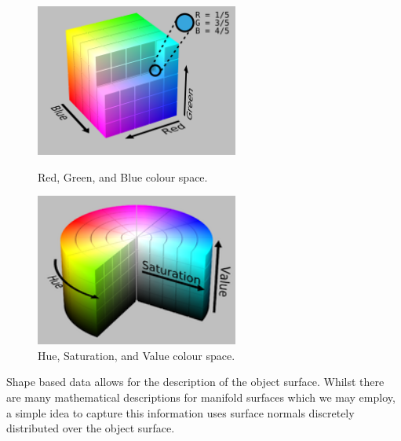 \documentclass[a4paper]{article}
\begin{document}
\vspace{0.5cm}
 
\begin{figure}[h]
	\centering
	\begin{minipage}{0.45\textwidth}
		\centering
		\includegraphics[height=5cm]{RGB_colour_space}
		\caption{Red, Green, and Blue colour space.}
	\end{minipage}
	\hspace{1cm}
	\begin{minipage}{0.45\textwidth}
		\centering
		\includegraphics[height=5cm]{HSV_colour_space}
		\caption{Hue, Saturation, and Value colour space.}
	\end{minipage}
\end{figure}

Shape based data allows for the description of the object surface. Whilst there are many mathematical descriptions for manifold surfaces which we may employ, a simple idea to capture this information uses surface normals discretely distributed over the object surface.
\end{document}
